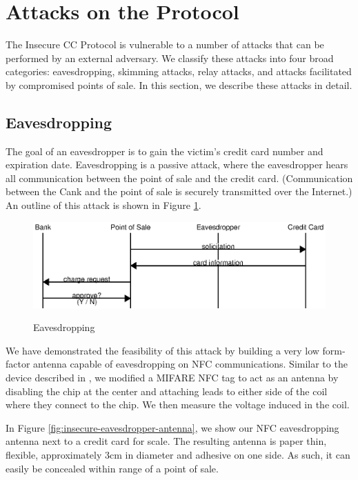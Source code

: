 \section{Attacks on the Protocol}
\label{sec:insecure-attacks}

The Insecure CC Protocol is vulnerable to a number of attacks that can be performed by an external adversary.
We classify these attacks into four broad categories:
    eavesdropping, skimming attacks, relay attacks, and attacks facilitated by compromised points of sale.
In this section, we describe these attacks in detail.


\subsection{Eavesdropping}
\label{sec:insecure-eavesdropper}
The goal of an eavesdropper is to gain the victim's credit card number and expiration date.
Eavesdropping is a passive attack, where the eavesdropper hears all communication between the point of sale and the credit card.
(Communication between the Cank and the point of sale is securely transmitted over the Internet.)
An outline of this attack is shown in Figure \ref{fig:insecure-eavesdropper}.

\begin{figure}
  \caption{Eavesdropping}
  \centering
    \includegraphics{img/attack-3-eavesdrop.eps}
  \label{fig:insecure-eavesdropper}
\end{figure}

We have demonstrated the feasibility of this attack by building a very low form-factor antenna capable of eavesdropping on NFC communications.
Similar to the device described in \cite{kortvedt2009eavesdropping}, we modified a MIFARE NFC tag to act as an antenna by disabling the chip at the center and attaching leads to either side of the coil where they connect to the chip.
We then measure the voltage induced in the coil.

In Figure \ref{fig:insecure-eavesdropper-antenna}, we show our NFC eavesdropping antenna next to a credit card for scale.
The resulting antenna is paper thin, flexible, approximately 3cm in diameter and adhesive on one side.
As such, it can easily be concealed within range of a point of sale.

